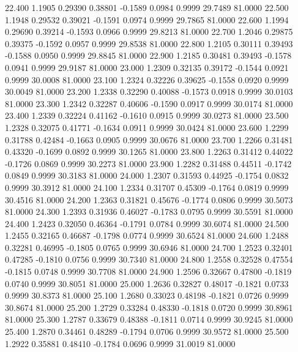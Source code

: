   22.400   1.1905   0.29390   0.38801  -0.1589   0.0984   0.9999  29.7489  81.0000
  22.500   1.1948   0.29532   0.39021  -0.1591   0.0974   0.9999  29.7865  81.0000
  22.600   1.1994   0.29690   0.39214  -0.1593   0.0966   0.9999  29.8213  81.0000
  22.700   1.2046   0.29875   0.39375  -0.1592   0.0957   0.9999  29.8538  81.0000
  22.800   1.2105   0.30111   0.39493  -0.1588   0.0950   0.9999  29.8845  81.0000
  22.900   1.2185   0.30481   0.39493  -0.1578   0.0941   0.9999  29.9187  81.0000
  23.000   1.2309   0.32135   0.39172  -0.1544   0.0921   0.9999  30.0008  81.0000
  23.100   1.2324   0.32226   0.39625  -0.1558   0.0920   0.9999  30.0049  81.0000
  23.200   1.2338   0.32290   0.40088  -0.1573   0.0918   0.9999  30.0103  81.0000
  23.300   1.2342   0.32287   0.40606  -0.1590   0.0917   0.9999  30.0174  81.0000
  23.400   1.2339   0.32224   0.41162  -0.1610   0.0915   0.9999  30.0273  81.0000
  23.500   1.2328   0.32075   0.41771  -0.1634   0.0911   0.9999  30.0424  81.0000
  23.600   1.2299   0.31788   0.42484  -0.1663   0.0905   0.9999  30.0676  81.0000
  23.700   1.2266   0.31481   0.43320  -0.1699   0.0892   0.9999  30.1265  81.0000
  23.800   1.2263   0.31412   0.44022  -0.1726   0.0869   0.9999  30.2273  81.0000
  23.900   1.2282   0.31488   0.44511  -0.1742   0.0849   0.9999  30.3183  81.0000
  24.000   1.2307   0.31593   0.44925  -0.1754   0.0832   0.9999  30.3912  81.0000
  24.100   1.2334   0.31707   0.45309  -0.1764   0.0819   0.9999  30.4516  81.0000
  24.200   1.2363   0.31821   0.45676  -0.1774   0.0806   0.9999  30.5073  81.0000
  24.300   1.2393   0.31936   0.46027  -0.1783   0.0795   0.9999  30.5591  81.0000
  24.400   1.2423   0.32050   0.46364  -0.1791   0.0784   0.9999  30.6074  81.0000
  24.500   1.2455   0.32165   0.46687  -0.1798   0.0774   0.9999  30.6524  81.0000
  24.600   1.2488   0.32281   0.46995  -0.1805   0.0765   0.9999  30.6946  81.0000
  24.700   1.2523   0.32401   0.47285  -0.1810   0.0756   0.9999  30.7340  81.0000
  24.800   1.2558   0.32528   0.47554  -0.1815   0.0748   0.9999  30.7708  81.0000
  24.900   1.2596   0.32667   0.47800  -0.1819   0.0740   0.9999  30.8051  81.0000
  25.000   1.2636   0.32827   0.48017  -0.1821   0.0733   0.9999  30.8373  81.0000
  25.100   1.2680   0.33023   0.48198  -0.1821   0.0726   0.9999  30.8674  81.0000
  25.200   1.2729   0.33284   0.48330  -0.1818   0.0720   0.9999  30.8961  81.0000
  25.300   1.2787   0.33679   0.48388  -0.1811   0.0714   0.9999  30.9245  81.0000
  25.400   1.2870   0.34461   0.48289  -0.1794   0.0706   0.9999  30.9572  81.0000
  25.500   1.2922   0.35881   0.48410  -0.1784   0.0696   0.9999  31.0019  81.0000
